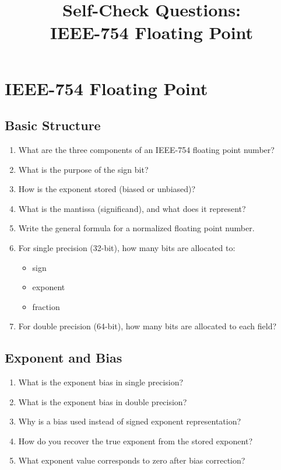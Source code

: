 \documentclass{self-check}
\title{Self-Check Questions:\\IEEE-754 Floating Point}
\author{}
\date{}
\begin{document}
\maketitle

\section{IEEE-754 Floating Point}

\subsection{Basic Structure}

\begin{enumerate}
  \item What are the three components of an IEEE-754 floating point number?
  \item What is the purpose of the sign bit?
  \item How is the exponent stored (biased or unbiased)?
  \item What is the mantissa (significand), and what does it represent?
  \item Write the general formula for a normalized floating point number.

  \item For single precision (32-bit), how many bits are allocated to:
    \begin{itemize}
      \item sign
      \item exponent
      \item fraction
    \end{itemize}

  \item For double precision (64-bit), how many bits are allocated to each field?
\end{enumerate}

\subsection{Exponent and Bias}

\begin{enumerate}
  \item What is the exponent bias in single precision?
  \item What is the exponent bias in double precision?
  \item Why is a bias used instead of signed exponent representation?
  \item How do you recover the true exponent from the stored exponent?
  \item What exponent value corresponds to zero after bias correction?
\end{enumerate}
\end{document}
